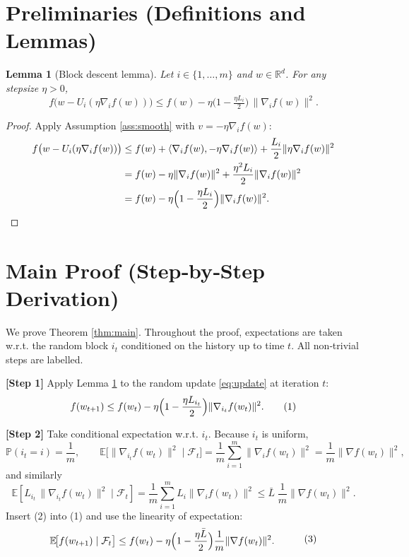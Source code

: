 \documentclass{article}
\newtheorem{lemma}{Lemma}
\newcommand{\E}{\mathbb{E}}
\newcommand{\R}{\mathbb{R}}
\begin{document}
\section*{Preliminaries (Definitions and Lemmas)}
\begin{lemma}[Block descent lemma]\label{lem:descent}
Let $i\in\{1,\dots,m\}$ and $w\in\R^{d}$. For any stepsize $\eta>0$,
\[
f\bigl(w-U_i(\eta\nabla_i f(w))\bigr)
\le 
f(w)-\eta\bigl(1-\tfrac{\eta L_i}{2}\bigr)\,\|\nabla_i f(w)\|^{2}.
\]
\end{lemma}
\begin{proof}
Apply Assumption \ref{ass:smooth} with $v=-\eta\nabla_i f(w)$:
\[
\begin{aligned}
f\bigl(w-U_i(\eta\nabla_i f(w))\bigr)
&\le f(w)+\langle\nabla_i f(w),-\eta\nabla_i f(w)\rangle
   +\frac{L_i}{2}\|\eta\nabla_i f(w)\|^{2}\\
&= f(w)-\eta\|\nabla_i f(w)\|^{2}
   +\frac{\eta^{2}L_i}{2}\|\nabla_i f(w)\|^{2}\\
&= f(w)-\eta\Bigl(1-\frac{\eta L_i}{2}\Bigr)\|\nabla_i f(w)\|^{2}.
\end{aligned}
\]
\end{proof}

\section*{Main Proof (Step‑by‑Step Derivation)}
We prove Theorem \ref{thm:main}. Throughout the proof, expectations are
taken w.r.t. the random block $i_t$ conditioned on the history up to time $t$.
All non‑trivial steps are labelled.

\bigskip
\noindent\textbf{[Step 1]} Apply Lemma \ref{lem:descent} to the random update
\eqref{eq:update} at iteration $t$:
\[
f(w_{t+1})
\le 
f(w_t)-\eta\Bigl(1-\frac{\eta L_{i_t}}{2}\Bigr)
   \|\nabla_{i_t}f(w_t)\|^{2}.
\tag{1}
\]

\noindent\textbf{[Step 2]} Take conditional expectation w.r.t. $i_t$.
Because $i_t$ is uniform,
\[
\mathbb{P}(i_t=i)=\frac1m,\qquad
\E\bigl[\|\nabla_{i_t}f(w_t)\|^{2}\mid\mathcal{F}_t\bigr]
   =\frac1m\sum_{i=1}^{m}\|\nabla_i f(w_t)\|^{2}
   =\frac1m\|\nabla f(w_t)\|^{2},
\]
and similarly
\[
\E\!\left[L_{i_t}\,\|\nabla_{i_t}f(w_t)\|^{2}\mid\mathcal{F}_t\right]
   =\frac1m\sum_{i=1}^{m}L_i\|\nabla_i f(w_t)\|^{2}
   \le \bar L\;\frac1m\|\nabla f(w_t)\|^{2}.
\tag{2}
\]
Insert (2) into (1) and use the linearity of expectation:
\[
\begin{aligned}
\E\!\bigl[f(w_{t+1})\mid\mathcal{F}_t\bigr]
&\le f(w_t)-\eta\Bigl(1-\frac{\eta\bar L}{2}\Bigr)
   \frac1m\|\nabla f(w_t)\|^{2}.
\end{aligned}
\tag{3}
\]
\end{document}
